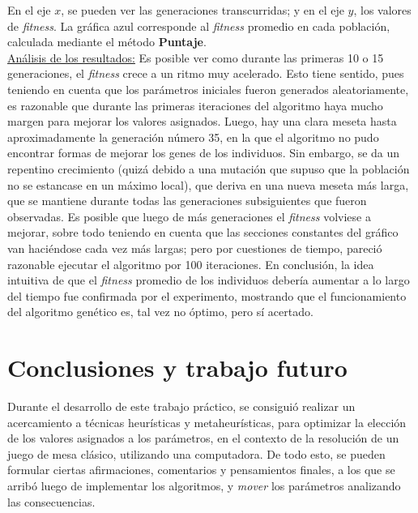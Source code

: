 \documentclass[12pt,a4paper]{article}
\begin{document}
    En el eje $x$, se pueden ver las generaciones transcurridas; y en el eje $y$, los valores de \textit{fitness}. La gráfica azul corresponde al \textit{fitness} promedio en cada población, calculada mediante el método \textbf{Puntaje}. \\[3pt]
    
    \underline{Análisis de los resultados:} 
    Es posible ver como durante las primeras 10 o 15 generaciones, el \textit{fitness} crece a un ritmo muy acelerado. Esto tiene sentido, pues teniendo en cuenta que los parámetros iniciales fueron generados aleatoriamente, es razonable que durante las primeras iteraciones del algoritmo haya mucho margen para mejorar los valores asignados. Luego, hay una clara meseta hasta aproximadamente la generación número 35, en la que el algoritmo no pudo encontrar formas de mejorar los genes de los individuos.
    Sin embargo, se da un repentino crecimiento (quizá debido a una mutación que supuso que la población no se estancase en un máximo local), que deriva en una nueva meseta más larga, que se mantiene durante todas las generaciones subsiguientes que fueron observadas.
    Es posible que luego de más generaciones el \textit{fitness} volviese a mejorar, sobre todo teniendo en cuenta que las secciones constantes del gráfico van haciéndose cada vez más largas; pero por cuestiones de tiempo, pareció razonable ejecutar el algoritmo por 100 iteraciones.
    En conclusión, la idea intuitiva de que el \textit{fitness} promedio de los individuos debería aumentar a lo largo del tiempo fue confirmada por el experimento, mostrando que el funcionamiento del algoritmo genético es, tal vez no óptimo, pero sí acertado.




\newpage



\section{Conclusiones y trabajo futuro}

Durante el desarrollo de este trabajo práctico, se consiguió realizar un acercamiento a técnicas heurísticas y metaheurísticas, para optimizar la elección de los valores asignados a los parámetros, en el contexto de la resolución de un juego de mesa clásico, utilizando una computadora. De todo esto, se pueden formular ciertas afirmaciones, comentarios y pensamientos finales, a los que se arribó luego de implementar los algoritmos, y \textit{mover} los parámetros analizando las consecuencias.
\end{document}
